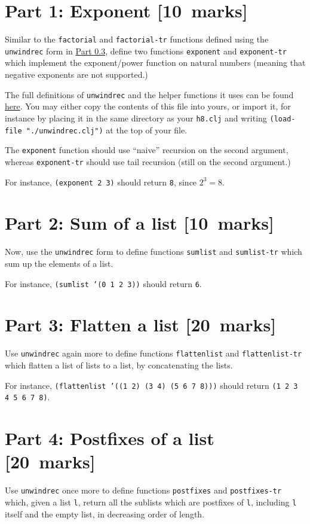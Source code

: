 \documentclass[11pt]{article}
\begin{document}
\section*{Part 1: Exponent              [10 marks]}
\label{sec:orge84495a}
Similar to the \texttt{factorial} and \texttt{factorial-tr} functions defined
using the \texttt{unwindrec} form in \hyperref[sec:org0c97417]{Part 0.3},
define two functions \texttt{exponent} and \texttt{exponent-tr} which
implement the exponent/power function on natural numbers
(meaning that negative exponents are not supported.)

The full definitions of \texttt{unwindrec} and the helper functions it uses
can be found \href{./src/h8/unwindrec.clj}{here}. You may either copy the contents of this file into yours,
or import it, for instance by placing it in the same directory
as your \texttt{h8.clj} and writing \texttt{(load-file "./unwindrec.clj")} at the top of your file.

The \texttt{exponent} function should use “naive” recursion on the second argument,
whereas \texttt{exponent-tr} should use tail recursion (still on the second argument.)

For instance, \texttt{(exponent 2 3)} should return \texttt{8}, since \(2^{3} = 8\).

\section*{Part 2: Sum of a list         [10 marks]}
\label{sec:org5876f6e}
Now, use the \texttt{unwindrec} form to define functions \texttt{sumlist} and \texttt{sumlist-tr} which
sum up the elements of a list.

For instance, \texttt{(sumlist '(0 1 2 3))} should return \texttt{6}.

\section*{Part 3: Flatten a list        [20 marks]}
\label{sec:orge8c9d0a}
Use \texttt{unwindrec} again more to define functions \texttt{flattenlist} and \texttt{flattenlist-tr} which
flatten a list of lists to a list, by concatenating the lists.

For instance, \texttt{(flattenlist '((1 2) (3 4) (5 6 7 8)))} should return \texttt{(1 2 3 4 5 6 7 8)}.

\section*{Part 4: Postfixes of a list   [20 marks]}
\label{sec:org80d9917}
Use \texttt{unwindrec} once more to define functions \texttt{postfixes} and \texttt{postfixes-tr} which,
given a list \texttt{l}, return all the sublists which are postfixes of \texttt{l},
including \texttt{l} itself and the empty list, in decreasing order of length.
\end{document}
